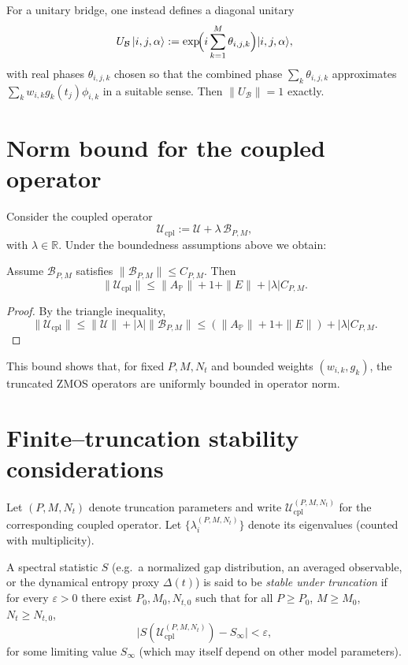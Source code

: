 \documentclass[11pt]{article}
\begin{document}
For a unitary bridge, one instead defines a diagonal unitary
\[
U_{\mathcal{B}}\,\lvert i,j,\alpha\rangle
  := \exp\!\Bigl(i \sum_{k=1}^M \theta_{i,j,k}\Bigr)\lvert i,j,\alpha\rangle,
\]
with real phases $\theta_{i,j,k}$ chosen so that the combined phase
$\sum_k \theta_{i,j,k}$ approximates $\sum_k w_{i,k} g_k(t_j)\phi_{i,k}$ in a suitable sense.
Then $\|U_{\mathcal{B}}\|=1$ exactly.

\section{Norm bound for the coupled operator}
\label{app:coupled}

Consider the coupled operator
\[
\mathcal{U}_{\mathrm{cpl}} := \mathcal{U} + \lambda\,\mathcal{B}_{P,M},
\]
with $\lambda\in\mathbb{R}$.
Under the boundedness assumptions above we obtain:

\begin{proposition}
Assume $\mathcal{B}_{P,M}$ satisfies $\|\mathcal{B}_{P,M}\|\le C_{P,M}$.
Then
\[
\|\mathcal{U}_{\mathrm{cpl}}\|
  \le \|A_{\mathbb{P}}\| + 1 + \|E\| + |\lambda| C_{P,M}.
\]
\end{proposition}

\begin{proof}
By the triangle inequality,
\[
\|\mathcal{U}_{\mathrm{cpl}}\|
  \le \|\mathcal{U}\| + |\lambda|\|\mathcal{B}_{P,M}\|
  \le (\|A_{\mathbb{P}}\| + 1 + \|E\|) + |\lambda| C_{P,M}.
\]
\end{proof}

This bound shows that, for fixed $P,M,N_t$ and bounded weights $(w_{i,k},g_k)$, the truncated ZMOS operators are uniformly bounded in operator norm.

\section{Finite--truncation stability considerations}
\label{app:stability}

Let $(P,M,N_t)$ denote truncation parameters and write $\mathcal{U}^{(P,M,N_t)}_{\mathrm{cpl}}$ for the corresponding coupled operator.
Let $\{\lambda_i^{(P,M,N_t)}\}$ denote its eigenvalues (counted with multiplicity).

\begin{definition}
A spectral statistic $S$ (e.g.\ a normalized gap distribution, an averaged observable, or the dynamical entropy proxy $\Delta(t)$) is said to be \emph{stable under truncation} if for every $\varepsilon>0$ there exist $P_0,M_0,N_{t,0}$ such that for all $P\ge P_0$, $M\ge M_0$, $N_t\ge N_{t,0}$,
\[
\bigl| S(\mathcal{U}^{(P,M,N_t)}_{\mathrm{cpl}}) - S_\infty \bigr| < \varepsilon,
\]
for some limiting value $S_\infty$ (which may itself depend on other model parameters).
\end{definition}
\end{document}
